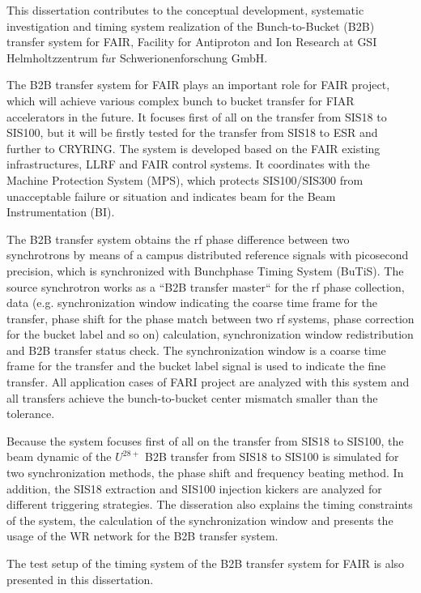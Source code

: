 This dissertation contributes to the conceptual development, systematic investigation and timing system realization of the Bunch-to-Bucket (B2B) transfer system for FAIR, Facility for Antiproton and Ion Research at GSI Helmholtzzentrum f$\ddot{u}$r Schwerionenforschung GmbH. 

The B2B transfer system for FAIR plays an important role for FAIR project, which will achieve various complex bunch to bucket transfer for FIAR accelerators in the future. It focuses first of all on the transfer from SIS18 to SIS100, but it will be firstly tested for the transfer from SIS18 to ESR and further to CRYRING. The system is developed based on the FAIR existing infrastructures, LLRF and FAIR control systems. It coordinates with the Machine Protection System (MPS), which protects SIS100/SIS300 from unacceptable failure or situation and indicates beam for the Beam Instrumentation (BI). 
 
The B2B transfer system obtains the rf phase difference between two synchrotrons by means of a campus distributed reference signals with picosecond precision, which is synchronized with Bunchphase Timing System (BuTiS). The source synchrotron works as a ``B2B transfer master`` for the rf phase collection, data (e.g. synchronization window indicating the coarse time frame for the transfer, phase shift for the phase match between two rf systems, phase correction for the bucket label and so on) calculation, synchronization window redistribution and B2B transfer status check. The synchronization window is a coarse time frame for the transfer and the bucket label signal is used to indicate the fine transfer. All application cases of FARI project are analyzed with this system and all transfers achieve the bunch-to-bucket center mismatch smaller than the tolerance.

Because the system focuses first of all on the transfer from SIS18 to SIS100, the beam dynamic of the $U^{28+}$ B2B transfer from SIS18 to SIS100 is simulated for two synchronization methods, the phase shift and frequency beating method. In addition, the SIS18 extraction and SIS100 injection kickers are analyzed for different triggering strategies. The disseration also explains the timing constraints of the system, the calculation of the synchronization window and presents the usage of the WR network for the B2B transfer system. 

The test setup of the timing system of the B2B transfer system for FAIR is also presented in this dissertation. 
